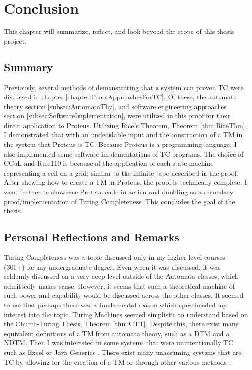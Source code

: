 \chapter{Conclusion}\label{chapter:Concl}

This chapter will summarize, reflect, and look beyond the scope of this thesis project.

\section{Summary}\label{sec:summary}

Previously, several methods of demonstrating that a system can proven TC were discussed in chapter \ref{chapter:ProofApproachesForTC}.
Of these, the automata theory section \ref{subsec:AutomataThy}, and software engineering approaches section \ref{subsec:SoftwareImplementation}, were utilized in this proof for their direct application to Proteus.
Utilizing Rice's Theorem, Theorem \ref{thm:RiceThm}, I demonstrated that with an undecidable input and the construction of a TM in the system that Proteus is TC.
Because Proteus is a programming language, I also implemented some software implementations of TC programs.
The choice of CGoL and Rule110 is because of the application of each state machine representing a cell on a grid; similar to the infinite tape described in the proof.
After showing how to create a TM in Proteus, the proof is technically complete.
I went further to showcase Proteus code in action and doubling as a secondary proof/implementation of Turing Completeness.
This concludes the goal of the thesis.

\section{Personal Reflections and Remarks}\label{sec:RefRem}

Turing Completeness was a topic discussed only in my higher level courses (300+) for my undergraduate degree.
Even when it was discussed, it was seldomly discussed on a very deep level outside of the Automata classes, which admittedly makes sense.
However, it seems that such a theoretical machine of such power and capability would be discussed across the other classes.
It seemed to me that perhaps there was a fundamental reason which spearheaded my interest into the topic.
Turing Machines seemed simplistic to understand based on the Church-Turing Thesis, Theorem \ref{thm:CTT}.
Despite this, there exist many equivalent definitions of a TM from automata theory, such as a DTM and a NDTM.
Then I was interested in some systems that were unintentionally TC such as Excel or Java Generics \cite{ExcelTC,JavaGenericsTC}.
There exist many unassuming systems that are TC by allowing for the creation of a TM or through other various methods \cite{AccTC,AccTC2}.

